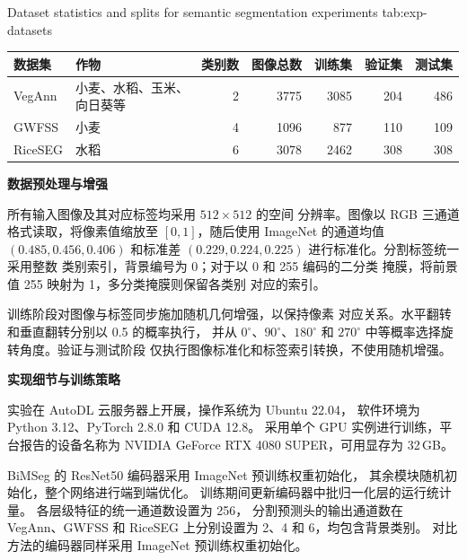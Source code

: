 \begin{table}[H]
  \centering
    {Dataset statistics and splits for semantic segmentation experiments}
    {tab:exp-datasets}
  \begin{spacing}{1.2}
    \normalfont{}
    \setlength{\tabcolsep}{4pt}
    \renewcommand{\arraystretch}{1.15}
    \begin{tabular}{@{}llrrrrr@{}}
      \toprule
      数据集 & 作物 & 类别数 & 图像总数 & 训练集 & 验证集 & 测试集 \\
      \midrule
      VegAnn  & \shortstack[l]{小麦、水稻、玉米、\\向日葵等}
              & 2 & 3775 & 3085 & 204 & 486 \\
      GWFSS   & 小麦 & 4 & 1096 & 877  & 110 & 109 \\
      RiceSEG & 水稻 & 6 & 3078 & 2462 & 308 & 308 \\
      \bottomrule
    \end{tabular}
  \end{spacing}
\end{table}

\FloatBarrier

\medskip\noindent\textbf{数据预处理与增强}\par
\label{sec:exp-preprocessing}

所有输入图像及其对应标签均采用 \(512\times512\) 的空间
分辨率。图像以 RGB 三通道格式读取，将像素值缩放至
\([0,1]\)，随后使用 ImageNet 的通道均值
\((0.485,0.456,0.406)\) 和标准差
\((0.229,0.224,0.225)\) 进行标准化。分割标签统一采用整数
类别索引，背景编号为 0；对于以 0 和 255 编码的二分类
掩膜，将前景值 255 映射为 1，多分类掩膜则保留各类别
对应的索引。

训练阶段对图像与标签同步施加随机几何增强，以保持像素
对应关系。水平翻转和垂直翻转分别以 0.5 的概率执行，
并从 \(0^\circ\)、\(90^\circ\)、\(180^\circ\) 和
\(270^\circ\) 中等概率选择旋转角度。验证与测试阶段
仅执行图像标准化和标签索引转换，不使用随机增强。

\medskip\noindent\textbf{实现细节与训练策略}\par
\label{sec:exp-implementation}

实验在 AutoDL 云服务器上开展，操作系统为 Ubuntu 22.04，
软件环境为 Python 3.12、PyTorch 2.8.0 和 CUDA 12.8。
采用单个 GPU 实例进行训练，平台报告的设备名称为
NVIDIA GeForce RTX 4080 SUPER，可用显存为 32\,GB。

BiMSeg 的 ResNet50 编码器采用 ImageNet 预训练权重初始化，
其余模块随机初始化，整个网络进行端到端优化。
训练期间更新编码器中批归一化层的运行统计量。
各层级特征的统一通道数设置为 256，
分割预测头的输出通道数在 VegAnn、GWFSS 和 RiceSEG
上分别设置为 2、4 和 6，均包含背景类别。
对比方法的编码器同样采用 ImageNet 预训练权重初始化。


